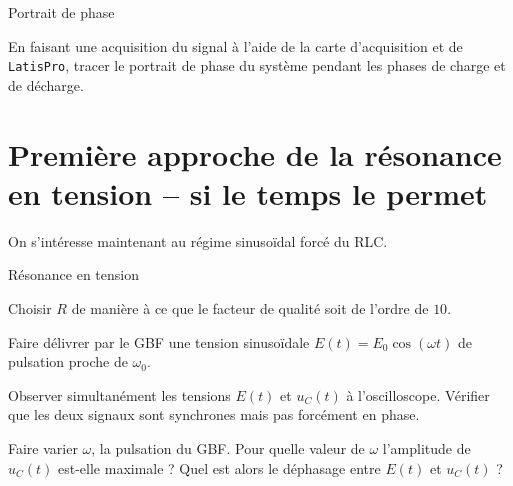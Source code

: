 \documentclass[a4paper,french,bookmarks]{article}
\begin{document}
\begin{experience}{Portrait de phase}{}
    \begin{enumerate}
        \ithand En faisant une acquisition du signal à l’aide de la carte d’acquisition et de \verb|LatisPro|, tracer le portrait de phase du système pendant les phases de charge et de décharge.
    \end{enumerate}
\end{experience}


\section{Première approche de la résonance en tension – si le temps le permet}

On s’intéresse maintenant au régime sinusoïdal forcé du RLC.

\begin{experience}{Résonance en tension}{}
    \begin{enumerate}
        \ithand Choisir $R$ de manière à ce que le facteur de qualité soit de l’ordre de $10$.
        
        \ithand Faire délivrer par le GBF une tension sinusoïdale $E(t) = E_0\cos(\omega t)$ de pulsation proche de $\omega_0$.
        
        \ithand Observer simultanément les tensions $E(t)$ et $u_C(t)$ à l’oscilloscope. Vérifier que les deux signaux sont synchrones mais pas forcément en phase.
        
        \ithand  Faire varier $\omega$, la pulsation du GBF. Pour quelle valeur de $\omega$ l’amplitude de $u_C(t)$ est-elle maximale ? Quel est alors le déphasage entre $E(t)$ et $u_C(t)$ ?
    \end{enumerate}
\end{experience}

\end{document}

